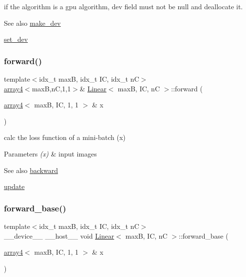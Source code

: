 if the algorithm is a gpu algorithm, dev field must not be null and deallocate it. 

\begin{DoxySeeAlso}{See also}
\hyperlink{structLinear_aecf7edf669cf1182b49b604a2c9b3212}{make\+\_\+dev} 

\hyperlink{structLinear_a0c6dcb67669d4984b6b9a676d4f14177}{set\+\_\+dev} 
\end{DoxySeeAlso}
\mbox{\label{structLinear_aed0294f2d1c2013f66d89a52474352e5}} 
\subsubsection{\texorpdfstring{forward()}{forward()}}
{\footnotesize\ttfamily template$<$idx\+\_\+t maxB, idx\+\_\+t IC, idx\+\_\+t nC$>$ \\
\hyperlink{structarray4}{array4}$<$maxB,nC,1,1$>$\& \hyperlink{structLinear}{Linear}$<$ maxB, IC, nC $>$\+::forward (\begin{DoxyParamCaption}\item[{\hyperlink{structarray4}{array4}$<$ maxB, IC, 1, 1 $>$ \&}]{x }\end{DoxyParamCaption})\hspace{0.3cm}{\ttfamily [inline]}}



calc the loss function of a mini-\/batch (x) 


\begin{DoxyParams}{Parameters}
{\em (x)} & input images \\
\hline
\end{DoxyParams}
\begin{DoxySeeAlso}{See also}
\hyperlink{structLinear_aeaa39d38b876fbd70794621955193fd3}{backward} 

\hyperlink{structLinear_a828a72af0a1ccac904325ee280dbefa4}{update} 
\end{DoxySeeAlso}
\mbox{\label{structLinear_adb02d44e0558e4e26b9a550945cd3b7e}} 
\subsubsection{\texorpdfstring{forward\+\_\+base()}{forward\_base()}}
{\footnotesize\ttfamily template$<$idx\+\_\+t maxB, idx\+\_\+t IC, idx\+\_\+t nC$>$ \\
\+\_\+\+\_\+device\+\_\+\+\_\+ \+\_\+\+\_\+host\+\_\+\+\_\+ void \hyperlink{structLinear}{Linear}$<$ maxB, IC, nC $>$\+::forward\+\_\+base (\begin{DoxyParamCaption}\item[{\hyperlink{structarray4}{array4}$<$ maxB, IC, 1, 1 $>$ \&}]{x }\end{DoxyParamCaption})\hspace{0.3cm}{\ttfamily [inline]}}



